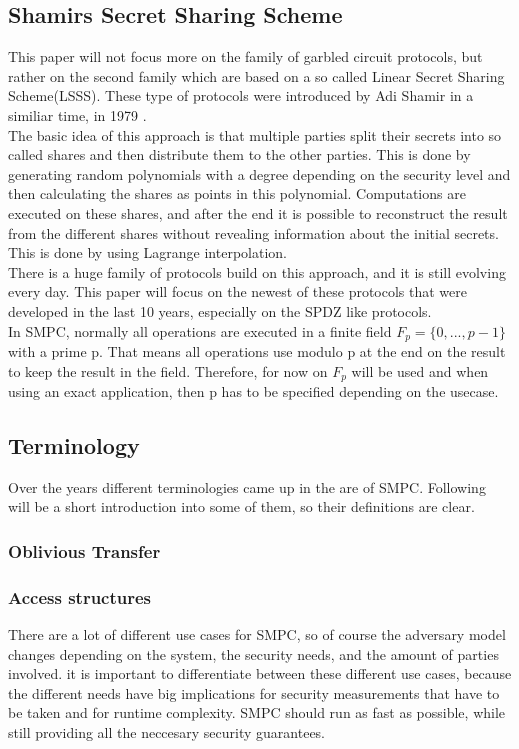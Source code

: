 \documentclass[english,runningheads,a4paper]{llncs}[2018/03/10]
\begin{document}
\subsection{Shamirs Secret Sharing Scheme}
This paper will not focus more on the family of garbled circuit protocols, but rather on the second family which are based on a so called Linear Secret Sharing Scheme(LSSS). 
These type of protocols were introduced by Adi Shamir in a similiar time, in 1979 \cite{Shamir:1979:SS:359168.359176}.\\
The basic idea of this approach is that multiple parties split their secrets into so called shares and then distribute them to the other parties. This is done by generating random polynomials with a degree depending on the security level and then calculating the shares as points in this polynomial. Computations are executed on these shares, and after the end it is possible to reconstruct the result from the different shares without revealing information about the initial secrets. This is done by using Lagrange interpolation.\\
 There is a huge family of protocols build on this approach, and it is still evolving every day. This paper will focus on the newest of these protocols that were developed in the last 10 years, especially on the SPDZ like protocols.\\
In SMPC, normally all operations are executed in a finite field \(F_p = \{ 0,...,p-1\}\) with a prime p. That means all operations use modulo p at the end on the result to keep the result in the field. Therefore, for now on \(F_p\) will be used and when using an exact application, then p has to be specified depending on the usecase.\\


\subsection{Terminology}
Over the years different terminologies came up in the are of SMPC. Following will be a short introduction into some of them, so their definitions are clear.

\subsubsection{Oblivious Transfer}

\subsubsection{Access structures}
There are a lot of different use cases for SMPC, so of course the adversary model changes depending on the system, the security needs, and the amount of parties involved. it is important to differentiate between these different use cases, because the different needs have big implications for security measurements that have to be taken and for runtime complexity. SMPC should run as fast as possible, while still providing all the neccesary security guarantees.
\end{document}
